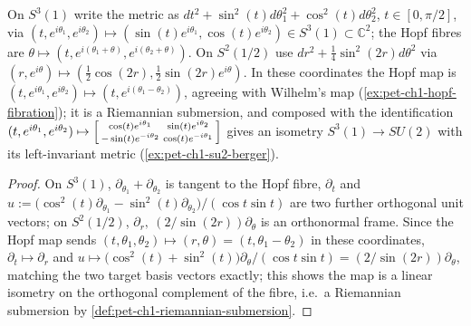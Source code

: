 \begin{example}
  \label{ex:pet-ch1-hopf-revisited}
  \leanok
  On $S^3(1)$ write the metric as $dt^2+\sin^2(t)d\theta_1^2+\cos^2(t)d\theta_2^2$,
  $t\in[0,\pi/2]$, via
  $(t,e^{i\theta_1},e^{i\theta_2})\mapsto(\sin(t)e^{i\theta_1},\cos(t)e^{i\theta_2})
  \in S^3(1)\subset\mathbb{C}^2$; the Hopf fibres are
  $\theta\mapsto(t,e^{i(\theta_1+\theta)},e^{i(\theta_2+\theta)})$. On
  $S^2(1/2)$ use $dr^2+\tfrac14\sin^2(2r)d\theta^2$ via
  $(r,e^{i\theta})\mapsto(\tfrac12\cos(2r),\tfrac12\sin(2r)e^{i\theta})$. In
  these coordinates the Hopf map is
  $(t,e^{i\theta_1},e^{i\theta_2})\mapsto(t,e^{i(\theta_1-\theta_2)})$, agreeing
  with Wilhelm's map (\cref{ex:pet-ch1-hopf-fibration}); it is a Riemannian
  submersion, and composed with the identification
  $(t,e^{i\theta_1},e^{i\theta_2})\mapsto\begin{bsmallmatrix}\cos(t)e^{i\theta_1}&\sin(t)e^{i\theta_2}\\-\sin(t)e^{-i\theta_2}&\cos(t)e^{-i\theta_1}\end{bsmallmatrix}$
  gives an isometry $S^3(1)\to SU(2)$ with its left-invariant metric
  (\cref{ex:pet-ch1-su2-berger}).
\end{example}
\begin{proof}
  \leanok
  On $S^3(1)$, $\partial_{\theta_1}+\partial_{\theta_2}$ is tangent to the Hopf
  fibre, $\partial_t$ and
  $u:=\big(\cos^2(t)\partial_{\theta_1}-\sin^2(t)\partial_{\theta_2}\big)/(\cos t\sin t)$
  are two further orthogonal unit vectors; on $S^2(1/2)$,
  $\partial_r,\ (2/\sin(2r))\partial_\theta$ is an orthonormal frame. Since the
  Hopf map sends $(t,\theta_1,\theta_2)\mapsto(r,\theta)=(t,\theta_1-\theta_2)$
  in these coordinates, $\partial_t\mapsto\partial_r$ and
  $u\mapsto\big(\cos^2(t)+\sin^2(t)\big)\partial_\theta/(\cos t\sin t)
  =(2/\sin(2r))\partial_\theta$, matching the two target basis vectors exactly;
  this shows the map is a linear isometry on the orthogonal complement of the
  fibre, i.e.\ a Riemannian submersion by \cref{def:pet-ch1-riemannian-submersion}.
\end{proof}

